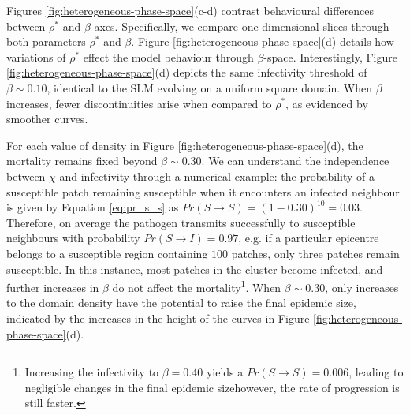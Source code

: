 Figures \ref{fig:heterogeneous-phase-space}(c-d) contrast behavioural differences between 
$\rho^*$ and $\beta$ axes. Specifically, we compare one-dimensional slices through both parameters $\rho^*$ and $\beta$.
Figure \ref{fig:heterogeneous-phase-space}(d) details how variations of $\rho^*$ effect the model behaviour through $\beta$-space. 
Interestingly, Figure \ref{fig:heterogeneous-phase-space}(d) depicts the same infectivity threshold of $\beta\sim 0.10$, 
identical to the SLM evolving on a uniform square domain. When $\beta$ increases, fewer discontinuities arise when
compared to $\rho^*$, as evidenced by smoother curves. 

For each value of density in Figure \ref{fig:heterogeneous-phase-space}(d), 
the mortality remains fixed beyond $\beta \sim 0.30$.
We can understand the independence between $\chi$ and infectivity through a numerical example:
the probability of a susceptible patch remaining susceptible when it encounters 
an infected neighbour is given by Equation \ref{eq:pr_s_s} as $Pr(S \rightarrow S) = (1 - 0.30)^{10} = 0.03$. 
Therefore, on average the pathogen transmits successfully to susceptible neighbours with probability $Pr(S\rightarrow I)=0.97$, 
e.g. if a particular epicentre belongs to a susceptible region containing $100$ patches, only three patches remain susceptible. 
In this instance, most patches in the cluster become infected, and further increases in $\beta$ do not affect the 
mortality\footnote{
Increasing the infectivity to $\beta=0.40$ yields a $Pr(S \rightarrow S) = 0.006$, 
leading to negligible changes in the final epidemic size\textemdash however, the rate of progression is still faster.
}. 
When $\beta \sim 0.30 $, only increases to the domain density have the potential to raise the final epidemic size, 
indicated by the increases in the height of the curves in Figure \ref{fig:heterogeneous-phase-space}(d). 

